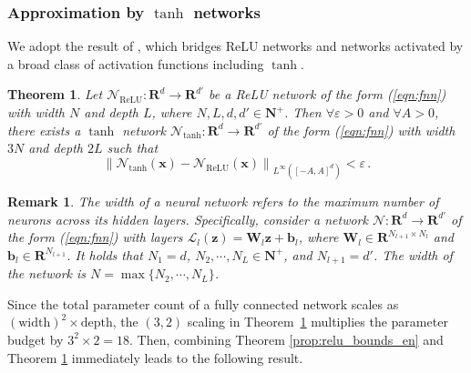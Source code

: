 \documentclass[final,hidelinks,onefignum,onetabnum]{siamart251216}
\newtheorem{thm}{Theorem}[section]
\newtheorem{remark}{Remark}
\begin{document}
\subsubsection{Approximation by $\tanh$ networks} \label{subsubsec3.5.2}
We adopt the result of \cite{zhaluzha24}, which bridges ReLU networks and networks activated by a broad class of activation functions including $\tanh$.

\begin{thm}\cite[Theorem~1]{zhaluzha24}\label{prop:tanh_bridge_en}
Let $\mathcal{N}_{\mathrm{ReLU}}:\mathbf{R}^d\to\mathbf{R}^{d'}$ be a ReLU network of the form (\ref{eqn:fnn}) with width $N$ and depth $L$, where $N, L, d, d' \in \mathbf{N}^+$. Then $\forall\varepsilon > 0$ and $\forall A > 0$, there exists a $\tanh$ network $\mathcal{N}_{\tanh}:\mathbf{R}^d\to\mathbf{R}^{d'}$ of the form (\ref{eqn:fnn}) with width $3N$ and depth $2L$ such that
	\begin{equation} \label{eqn:tanh_bridge}
		\left\| \mathcal{N}_{\tanh}(\mathbf{x}) - \mathcal{N}_{\mathrm{ReLU}}(\mathbf{x})\right\|_{L^\infty([-A,A]^d)} < \varepsilon\,.
	\end{equation}
\end{thm}

\begin{remark} \label{neural_width}
The width of a neural network refers to the maximum number of neurons across its hidden layers. Specifically, consider a network $\mathcal{N}:\mathbf{R}^d\to\mathbf{R}^{d'}$ of the form (\ref{eqn:fnn}) with layers $\mathcal{L}_l(\mathbf{z})=\mathbf{W}_l\mathbf{z}+\mathbf{b}_l$, where $\mathbf{W}_l\in\mathbf{R}^{N_{l+1}\times{N_l}}$ and $\mathbf{b}_l\in\mathbf{R}^{N_{l+1}}$. It holds that $N_1=d$, $N_2,\cdots,N_L\in \mathbf{N}^+$, and $N_{l+1}=d'$. The width of the network is $N=\max\{N_2,\cdots,N_L\}$.
\end{remark}

Since the total parameter count of a fully connected network scales as $(\text{width})^2 \times \text{depth}$, the $(3,2)$ scaling in Theorem~\ref{prop:tanh_bridge_en} multiplies the parameter budget by $3^2 \times 2 = 18$. Then, combining Theorem \ref{prop:relu_bounds_en} and Theorem \ref{prop:tanh_bridge_en} immediately leads to the following result.
\end{document}
